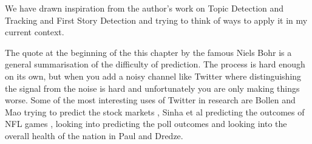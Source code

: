 \documentclass[minf,twoside,singlespacing,parskip,frontabs,notimes,12pt]{infthesis} %
\begin{document}
We have drawn inspiration from the author's work on Topic Detection and Tracking and First Story Detection and trying to think of ways to apply it in my current context. 

The quote at the beginning of the this chapter by the famous Niels Bohr is a general summarisation of the difficulty of prediction. The process is hard enough on its own, but when you add a noisy channel like Twitter where distinguishing the signal from the noise is hard and unfortunately you are only making things worse. Some of the most interesting uses of Twitter in research are Bollen and Mao trying to predict the stock markets \cite{twitstock}, Sinha et al predicting the outcomes of NFL games \cite{twitnfl}, looking into predicting the poll outcomes \cite{twitpoll} and looking into the overall health of the nation in Paul and Dredze\cite{twitflu}.
\end{document}
